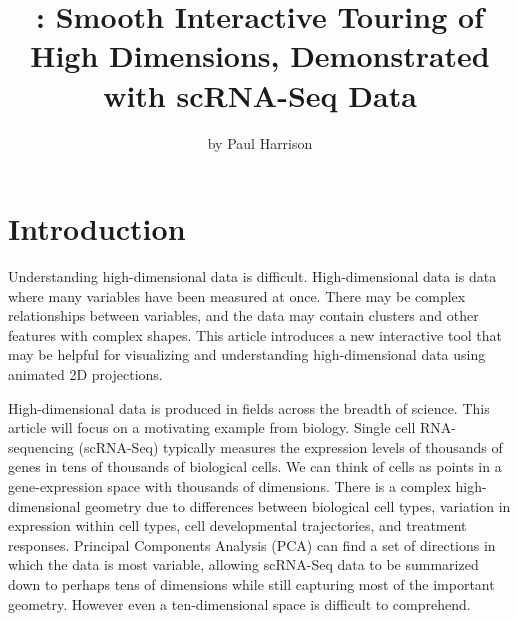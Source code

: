 \title{: Smooth Interactive Touring of High Dimensions, Demonstrated with scRNA-Seq Data}


\author{by Paul Harrison}

\maketitle


\hypertarget{introduction}{%
\section{Introduction}\label{introduction}}

Understanding high-dimensional data is difficult. High-dimensional data is data where many variables have been measured at once. There may be complex relationships between variables, and the data may contain clusters and other features with complex shapes. This article introduces a new interactive tool that may be helpful for visualizing and understanding high-dimensional data using animated 2D projections.

High-dimensional data is produced in fields across the breadth of science. This article will focus on a motivating example from biology. Single cell RNA-sequencing (scRNA-Seq) typically measures the expression levels of thousands of genes in tens of thousands of biological cells. We can think of cells as points in a gene-expression space with thousands of dimensions. There is a complex high-dimensional geometry due to differences between biological cell types, variation in expression within cell types, cell developmental trajectories, and treatment responses. Principal Components Analysis (PCA) can find a set of directions in which the data is most variable, allowing scRNA-Seq data to be summarized down to perhaps tens of dimensions while still capturing most of the important geometry. However even a ten-dimensional space is difficult to comprehend.

